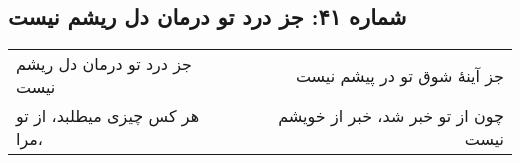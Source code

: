 \begin{center}
\section*{شماره ۴۱: جز درد تو درمان دل ریشم نیست}
\label{sec:041}
\begin{longtable}{l p{0.5cm} r}
جز درد تو درمان دل ریشم نیست
&&
جز آینهٔ شوق تو در پیشم نیست
\\
هر کس چیزی میطلبد، از تو مرا،
&&
چون از تو خبر شد، خبر از خویشم نیست
\\
\end{longtable}
\end{center}
